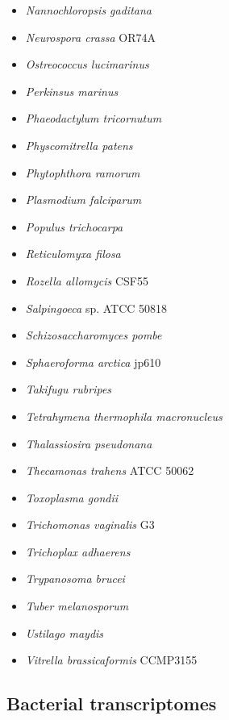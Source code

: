 \begin{itemize}
\item\textit{Nannochloropsis gaditana}
\item\textit{Neurospora crassa} OR74A
\item\textit{Ostreococcus lucimarinus}
\item\textit{Perkinsus marinus}
\item\textit{Phaeodactylum tricornutum}
\item\textit{Physcomitrella patens}
\item\textit{Phytophthora ramorum}
\item\textit{Plasmodium falciparum}
\item\textit{Populus trichocarpa}
\item\textit{Reticulomyxa filosa}
\item\textit{Rozella allomycis} CSF55
\item\textit{Salpingoeca} sp. ATCC 50818
\item\textit{Schizosaccharomyces pombe}
\item\textit{Sphaeroforma arctica} jp610
\item\textit{Takifugu rubripes}
\item\textit{Tetrahymena thermophila macronucleus}
\item\textit{Thalassiosira pseudonana}
\item\textit{Thecamonas trahens} ATCC 50062
\item\textit{Toxoplasma gondii}
\item\textit{Trichomonas vaginalis} G3
\item\textit{Trichoplax adhaerens}
\item\textit{Trypanosoma brucei}
\item\textit{Tuber melanosporum}
\item\textit{Ustilago maydis}
\item\textit{Vitrella brassicaformis} CCMP3155
    \end{itemize}

\subsection{Bacterial transcriptomes}\label{sec:edicer_genome_bacteria}

